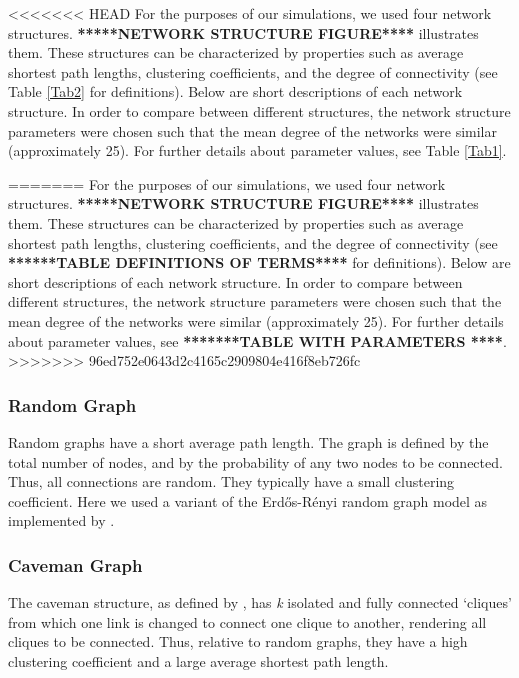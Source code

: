 <<<<<<< HEAD
For the purposes of our simulations, we used four network structures. \textbf{*****NETWORK STRUCTURE FIGURE****} illustrates them. These structures can be characterized by properties such as average shortest path lengths, clustering coefficients, and the degree of connectivity (see Table \ref{Tab2} for definitions). Below are short descriptions of each network structure. In order to compare between different structures, the network structure parameters were chosen such that the mean degree of the networks were similar (approximately 25). For further details about parameter values, see Table \ref{Tab1}.


=======
For the purposes of our simulations, we used four network structures. \textbf{*****NETWORK STRUCTURE FIGURE****} illustrates them. These structures can be characterized by properties such as average shortest path lengths, clustering coefficients, and the degree of connectivity (see \textbf{******TABLE DEFINITIONS OF TERMS****} for definitions). Below are short descriptions of each network structure. In order to compare between different structures, the network structure parameters were chosen such that the mean degree of the networks were similar (approximately 25). For further details about parameter values, see \textbf{*******TABLE WITH PARAMETERS ****}.
>>>>>>> 96ed752e0643d2c4165c2909804e416f8eb726fc

\subsubsection{Random Graph}
\label{4.2}

Random graphs have a short average path length. The graph is defined by the total number of nodes, and by the probability of any two nodes to be connected. Thus, all connections are random. They typically have a small clustering coefficient. Here we used a variant of the Erd\H{o}s-R\'enyi random graph model \citep*{ER1960} as implemented by \citet*{BS2011}.

\subsubsection{Caveman Graph}
\label{4.3}

The caveman structure, as defined by \citet*{W2003}, has \emph{k} isolated and fully connected `cliques' from which one link is changed to connect one clique to another, rendering all cliques to be connected. Thus, relative to random graphs, they have a high clustering coefficient and a large average shortest path length.

